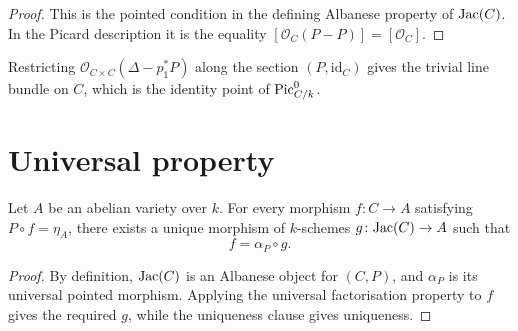 \begin{proof}
  This is the pointed condition in the defining Albanese property of
  \(\mathrm{Jac}(C)\).  In the Picard description it is the equality
  \([\mathcal O_C(P-P)] = [\mathcal O_C]\).
\end{proof}

\begin{remark}
  \label{mk-rem:comp_ofCurve_classical}
  Restricting \(\mathcal O_{C\times C}(\Delta-p_1^*P)\) along the section
  \((P,\mathrm{id}_C)\) gives the trivial line bundle on \(C\), which is the
  identity point of \(\operatorname{Pic}^0_{C/k}\).
\end{remark}

\section{Universal property}

\begin{theorem}\label{mk-thm:exists_unique_ofCurve_comp}
  \leanok

  Let \(A\) be an abelian variety over \(k\).  For every morphism
  \(f \colon C \to A\) satisfying \(P \circ f = \eta_A\), there exists a
  unique morphism of \(k\)-schemes \(g \colon \mathrm{Jac}(C) \to A\) such that
  \[
    f = \alpha_P \circ g.
  \]
\end{theorem}

\begin{proof}
  By definition, \(\mathrm{Jac}(C)\) is an Albanese object for \((C,P)\), and
  \(\alpha_P\) is its universal pointed morphism.  Applying the universal
  factorisation property to \(f\) gives the required \(g\), while the
  uniqueness clause gives uniqueness.
\end{proof}
